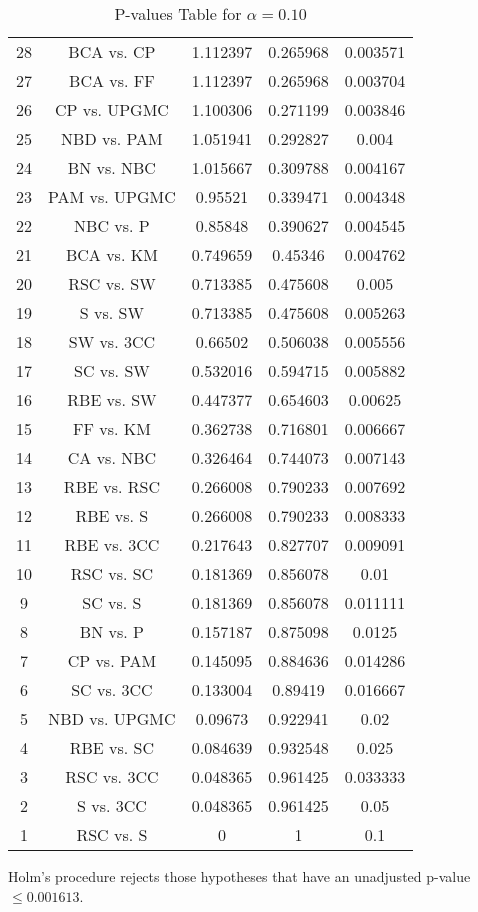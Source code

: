 \documentclass[a4paper,10pt]{article}
\begin{document}
\begin{landscape}
\begin{table}[!htp]
\begin{tabular}{ccccc}
28&BCA vs. CP&1.112397&0.265968&0.003571\\
27&BCA vs. FF&1.112397&0.265968&0.003704\\
26&CP vs. UPGMC&1.100306&0.271199&0.003846\\
25&NBD vs. PAM&1.051941&0.292827&0.004\\
24&BN vs. NBC&1.015667&0.309788&0.004167\\
23&PAM vs. UPGMC&0.95521&0.339471&0.004348\\
22&NBC vs. P&0.85848&0.390627&0.004545\\
21&BCA vs. KM&0.749659&0.45346&0.004762\\
20&RSC vs. SW&0.713385&0.475608&0.005\\
19&S vs. SW&0.713385&0.475608&0.005263\\
18&SW vs. 3CC&0.66502&0.506038&0.005556\\
17&SC vs. SW&0.532016&0.594715&0.005882\\
16&RBE vs. SW&0.447377&0.654603&0.00625\\
15&FF vs. KM&0.362738&0.716801&0.006667\\
14&CA vs. NBC&0.326464&0.744073&0.007143\\
13&RBE vs. RSC&0.266008&0.790233&0.007692\\
12&RBE vs. S&0.266008&0.790233&0.008333\\
11&RBE vs. 3CC&0.217643&0.827707&0.009091\\
10&RSC vs. SC&0.181369&0.856078&0.01\\
9&SC vs. S&0.181369&0.856078&0.011111\\
8&BN vs. P&0.157187&0.875098&0.0125\\
7&CP vs. PAM&0.145095&0.884636&0.014286\\
6&SC vs. 3CC&0.133004&0.89419&0.016667\\
5&NBD vs. UPGMC&0.09673&0.922941&0.02\\
4&RBE vs. SC&0.084639&0.932548&0.025\\
3&RSC vs. 3CC&0.048365&0.961425&0.033333\\
2&S vs. 3CC&0.048365&0.961425&0.05\\
1&RSC vs. S&0&1&0.1\\
\hline
\end{tabular}
\caption{P-values Table for $\alpha=0.10$}
\end{table}Holm's procedure rejects those hypotheses that have an unadjusted p-value $\le0.001613$.

\pagebreak


\end{landscape}
\end{document}
